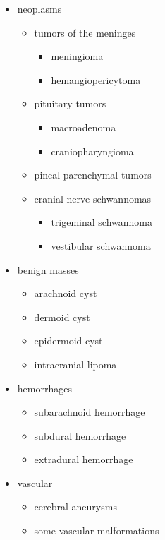\begin{itemize}
	\tightlist
	\item
	neoplasms
	
	\begin{itemize}
		\tightlist
		\item
		tumors of the meninges
		
		\begin{itemize}
			\tightlist
			\item
			meningioma
			\item
			hemangiopericytoma
		\end{itemize}
		\item
		pituitary tumors
		
		\begin{itemize}
			\tightlist
			\item
			macroadenoma
			\item
			craniopharyngioma
		\end{itemize}
		\item
		pineal parenchymal tumors
		\item
		cranial nerve schwannomas
		
		\begin{itemize}
			\tightlist
			\item
			trigeminal schwannoma
			\item
			vestibular schwannoma
		\end{itemize}
	\end{itemize}
	\item
	benign masses
	
	\begin{itemize}
		\tightlist
		\item
		arachnoid cyst
		\item
		dermoid cyst
		\item
		epidermoid cyst
		\item
		intracranial lipoma
	\end{itemize}
	\item
	hemorrhages
	
	\begin{itemize}
		\tightlist
		\item
		subarachnoid hemorrhage
		\item
		subdural hemorrhage
		\item
		extradural hemorrhage
	\end{itemize}
	\item
	vascular
	
	\begin{itemize}
		\tightlist
		\item
		cerebral aneurysms
		\item
		some vascular malformations
	\end{itemize}
\end{itemize}

